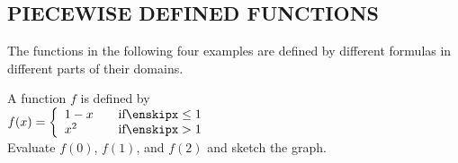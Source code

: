 \documentclass{sebase}
\begin{document}
\subsection{PIECEWISE DEFINED FUNCTIONS}

The functions in the following four examples are defined by different
formulas in different parts of their domains.

\begin{Example}[7]
\VIDEO%
%
%
A function $f$ is defined by \\[6pt]
\hspace*{\fill}$f(x)=\left\{ 
\begin{array}{ll}
1-x\quad  & \text{if}%
\enskip%
x\leq 1 \\ 
x^{2} & \text{if}%
\enskip%
x>1%
\end{array}%
\right. $\hspace*{\fill}\\[6pt]
Evaluate $f(0)$, $f(1)$, and $f(2)$ and sketch the graph.
\end{Example}
\end{document}
